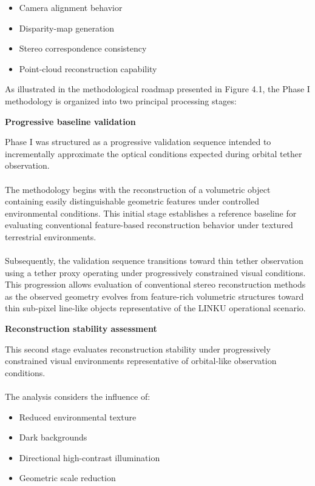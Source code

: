 \begin{itemize}
    \item Camera alignment behavior
    \item Disparity-map generation
    \item Stereo correspondence consistency
    \item Point-cloud reconstruction capability
\end{itemize}

As illustrated in the methodological roadmap presented in Figure 4.1, the Phase I methodology is organized into two principal processing stages:

\vspace{0.5cm}
\noindent \textbf{Progressive baseline validation}
\vspace{0.2cm}

Phase I was structured as a progressive validation sequence intended to incrementally approximate the optical conditions expected during orbital tether observation.
\\\\
The methodology begins with the reconstruction of a volumetric object containing easily distinguishable geometric features under controlled environmental conditions. This initial stage establishes a reference baseline for evaluating conventional feature-based reconstruction behavior under textured terrestrial environments.
\\\\
Subsequently, the validation sequence transitions toward thin tether observation using a tether proxy operating under progressively constrained visual conditions. This progression allows evaluation of conventional stereo reconstruction methods as the observed geometry evolves from feature-rich volumetric structures toward thin sub-pixel line-like objects representative of the LINKU operational scenario.

\vspace{0.5cm}
\noindent \textbf{Reconstruction stability assessment}
\vspace{0.2cm}

This second stage evaluates reconstruction stability under progressively constrained visual environments representative of orbital-like observation conditions.
\\\\
The analysis considers the influence of:

\begin{itemize}
    \item Reduced environmental texture
    \item Dark backgrounds
    \item Directional high-contrast illumination
    \item Geometric scale reduction
\end{itemize}

